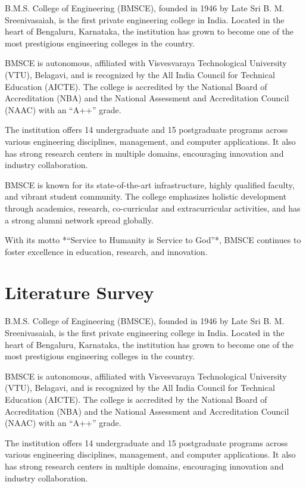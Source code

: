 \documentclass[12pt,a4paper]{report}
\begin{document}
B.M.S. College of Engineering (BMSCE), founded in 1946 by Late Sri B. M. Sreenivasaiah, 
is the first private engineering college in India. Located in the heart of Bengaluru, 
Karnataka, the institution has grown to become one of the most prestigious engineering 
colleges in the country. 

BMSCE is autonomous, affiliated with Visvesvaraya Technological University (VTU), Belagavi, 
and is recognized by the All India Council for Technical Education (AICTE). The college is 
accredited by the National Board of Accreditation (NBA) and the National Assessment and 
Accreditation Council (NAAC) with an “A++” grade.

The institution offers 14 undergraduate and 15 postgraduate programs across various 
engineering disciplines, management, and computer applications. It also has strong research 
centers in multiple domains, encouraging innovation and industry collaboration. 

BMSCE is known for its state-of-the-art infrastructure, highly qualified faculty, and vibrant 
student community. The college emphasizes holistic development through academics, research, 
co-curricular and extracurricular activities, and has a strong alumni network spread 
globally. 

With its motto *“Service to Humanity is Service to God”*, BMSCE continues to foster 
excellence in education, research, and innovation.

\chapter{Literature Survey}
B.M.S. College of Engineering (BMSCE), founded in 1946 by Late Sri B. M. Sreenivasaiah, 
is the first private engineering college in India. Located in the heart of Bengaluru, 
Karnataka, the institution has grown to become one of the most prestigious engineering 
colleges in the country. 

BMSCE is autonomous, affiliated with Visvesvaraya Technological University (VTU), Belagavi, 
and is recognized by the All India Council for Technical Education (AICTE). The college is 
accredited by the National Board of Accreditation (NBA) and the National Assessment and 
Accreditation Council (NAAC) with an “A++” grade.

The institution offers 14 undergraduate and 15 postgraduate programs across various 
engineering disciplines, management, and computer applications. It also has strong research 
centers in multiple domains, encouraging innovation and industry collaboration. 
\end{document}
